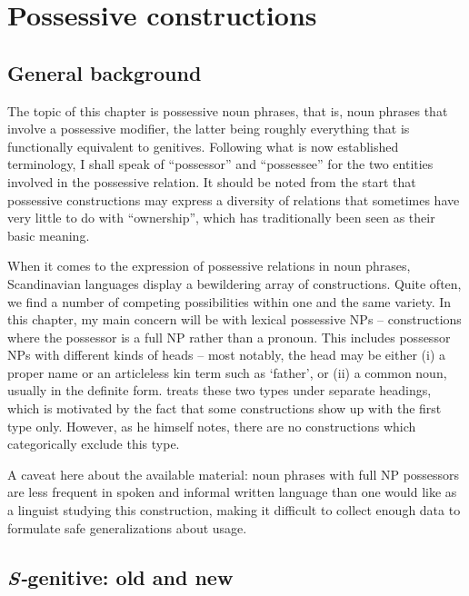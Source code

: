 
\chapter{Possessive constructions}
\label{bkm:Ref155077914}\section{General background}

The topic of this chapter is possessive noun phrases, that is, noun phrases that involve a possessive modifier, the latter being roughly everything that is functionally equivalent to genitives. Following what is now established terminology, I shall speak of “possessor” and “possessee” for the two entities involved in the possessive relation. It should be noted from the start that possessive constructions may express a diversity of relations that sometimes have very little to do with “ownership”, which has traditionally been seen as their basic meaning. 

When it comes to the expression of possessive relations in noun phrases, Scandinavian languages display a bewildering array of constructions. Quite often, we find a number of competing possibilities within one and the same variety. In this chapter, my main concern will be with lexical possessive NPs – constructions where the possessor is a full NP rather than a pronoun. This includes possessor NPs with different kinds of heads – most notably, the head may be either (i) a proper name or an articleless kin term such as ‘father’, or (ii) a common noun, usually in the definite form. \citet{Delsing2003a} treats these two types under separate headings, which is motivated by the fact that some constructions show up with the first type only. However, as he himself notes, there are no constructions which categorically exclude this type. 

A caveat here about the available material: noun phrases with full NP possessors are less frequent in spoken and informal written language than one would like as a linguist studying this construction, making it difficult to collect enough data to formulate safe generalizations about usage. 

\section{\textit{S-}genitive: old and new}

